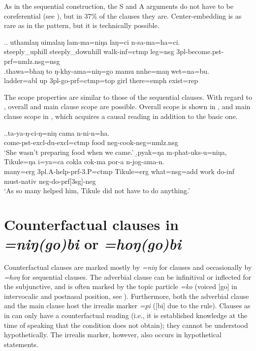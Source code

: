 As in the sequential construction, the S and A arguments do not have to be coreferential (see \Next), but in 37\% of the clauses they are. Center-embedding is as rare as in the  pattern, but it is technically possible.

 \ex.\ag. uthamlaŋ uimalaŋ lam-ma=niŋa laŋ=ci n-sa-ma=ha=ci.\\
		steeply\_uphill steeply\_downhill walk{\sc -inf=ctmp} leg{\sc =nsg} {\sc 3pl-}become{\sc .pst-prf=nmlz.nsg=nsg}\\ 
	\bg.thawa=bhaŋ    to  ŋ-khy-ama=niŋ=go                    mamu nnhe=maŋ    wet=na=bu.\\
ladder{\sc =abl} up {\sc 3pl-}go{\sc -prf=ctmp=top} girl there{\sc =emph} exist{\sc [3sg]=rep}\\
 


The scope properties are similar to those of the sequential clauses. With regard  to , overall and main clause scope are possible. Overall scope is shown in \Next[a], and main clause scope in \Next[b], which acquires a causal reading in addition to the basic  one. 

\ex.\ag.ta-ya-ŋ-ci-ŋ=niŋ cama n-ni-n=ha.\\
		come{\sc -pst-excl-du-excl=ctmp} food {\sc neg-}cook{\sc [pst;3.P]-neg=nmlz.nsg}\\
		‘She wasn’t preparing food when we came.’
	\b.\label{ex-tikule-do}\gll	pyak=ŋa m-phat-uks-u=niŋa, Tikule=ŋa   i=ya=ca cokla cok-ma    por-a n-jog-ama-n.\\
		many={\sc erg} {\sc 3pl.A-}help{\sc -prf-3.P=ctmp} Tikule={\sc erg} what{\sc =nsg=add} work  do{\sc -inf} must{\sc -nativ} {\sc neg-}do{\sc -prf[3sg]-neg}\\
		‘As so many helped him, Tikule did not have to do anything.’ 



\section{Counterfactual clauses in \emph{=niŋ(go)bi} or  \emph{=hoŋ(go)bi} }\label{adv-cl-count}

Counterfactual clauses are marked mostly by \emph{=niŋ} for  clauses and occasionally by \emph{=hoŋ} for sequential clauses. The adverbial clause can be infinitival or inflected for the subjunctive, and is often marked by the topic particle \emph{=ko} (voiced [go]  in intervocalic and postnasal position, see ). Furthermore, both the adverbial clause and the main clause host the irrealis marker \emph{=pi} ([bi] due to the  rule). Clauses as in \Next can only have a counterfactual reading (i.e., it is established knowledge at the time of speaking that the condition does not obtain); they cannot be understood hypothetically. The irrealis marker, however, also occurs in hypothetical statements.



